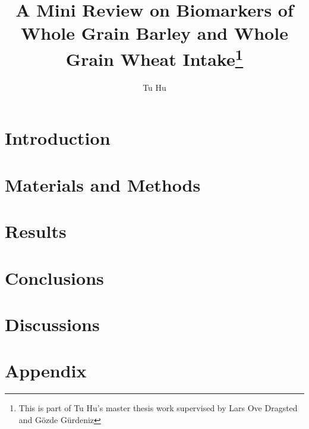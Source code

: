 \documentclass[]{article}
\title{A Mini Review on Biomarkers of Whole Grain Barley and Whole Grain Wheat Intake\footnote{This is part of Tu Hu's master thesis work supervised by Lars Ove Dragsted and Gözde Gürdeniz}}
\author{Tu Hu}
\begin{document}
\maketitle

\begin{abstract}

\end{abstract}

\section{Introduction}


\section{Materials and Methods}


\section{Results}


\section{Conclusions}

\section{Discussions}


\section{Appendix}


\clearpage
\printbibliography[
heading=bibintoc,
title={References}
]
\end{document}
